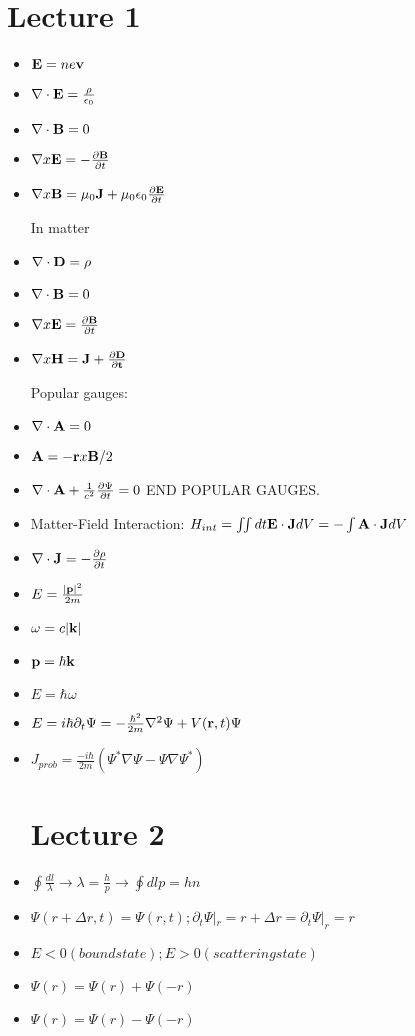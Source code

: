 \documentclass{article}
\begin{document}
\section*{Lecture 1}

\begin{itemize}
\item ${\bf E} =ne\bf v$
\item $\nabla \cdot {\bf E} = \frac{\rho}{\epsilon_0}$
\item $\nabla \cdot {\bf B} = 0 $
\item $\nabla x {\bf E}=-\frac{\partial {\bf B}}{\partial t}$
\item $\nabla x {\bf B} = \mu_0 {\bf J} + \mu_0 \epsilon_0 \frac{\partial {\bf E}}{\partial t}$

In matter

\item $\nabla \cdot {\bf D} = \rho$
\item $\nabla \cdot {\bf B} = 0$
\item $\nabla x {\bf E}=\frac{\partial {\bf B}}{\partial t}$
\item $\nabla x {\bf H} = \bf{J} + \frac{\partial \bf{D}}{\partial t}$

Popular gauges:
\item $\nabla \cdot {\bf A} = 0$
\item ${\bf A}=-{\bf r}x{\bf B}/2$
\item $\nabla \cdot {\bf A} +\frac{1}{c^2}\frac{\partial \Psi}{\partial t}=0 $
END POPULAR GAUGES.

\item Matter-Field Interaction: $H_{int} = \iint{dt {\bf E}\cdot{\bf J} dV} = -\int{{\bf A}\cdot{\bf J}dV}$
\item $\nabla \cdot {\bf J} = -\frac{\partial \rho}{\partial t}$
\item $E = \frac{|{\bf p}|^2}{2m} $
\item $ \omega = c|{\bf k}| $
\item $ {\bf p} = \hbar {\bf k} $
\item $ E = \hbar \omega $
\item $ E = i\hbar \partial_t \Psi = -\frac{\hbar^2}{2m}\nabla^2 \Psi + V({\bf r},t) \Psi$
\item $ J_{prob}=\frac{-i\hbar}{2m}(\Psi^*\nabla \Psi-\Psi \nabla \Psi^*)$

\section*{Lecture 2}
\item $\oint{\frac{dl}{\lambda}}\rightarrow \lambda = \frac{h}{p} \rightarrow \oint{dl p}= h n$
\item $\Psi(r+\Delta r,t)=\Psi(r,t) ; \partial_t \Psi |_r=r+\Delta r = \partial_t \Psi |_r=r$
\item $ E<0 (bound state); E>0 (scattering state) $
\item $ \Psi(r)=\Psi(r)+\Psi(-r) $
\item $ \Psi(r)=\Psi(r)-\Psi(-r) $


\end{itemize}
\end{document}

